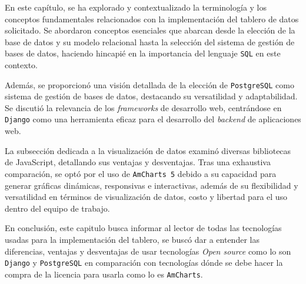 


En este capítulo, se ha explorado y contextualizado la terminología y los conceptos fundamentales relacionados con la implementación del tablero de datos solicitado. Se abordaron conceptos esenciales que abarcan desde la elección de la base de datos y su modelo relacional hasta la selección del sistema de gestión de bases de datos, haciendo hincapié en la importancia del lenguaje \texttt{SQL} en este contexto.

Además, se proporcionó una visión detallada de la elección de \texttt{PostgreSQL} como sistema de gestión de bases de datos, destacando su versatilidad y adaptabilidad. 
Se discutió la relevancia de los \textit{frameworks} de desarrollo web, centrándose en \texttt{Django} como una herramienta eficaz para el desarrollo del \textit{backend} de aplicaciones web.

La subsección dedicada a la visualización de datos examinó diversas bibliotecas de JavaScript, detallando sus ventajas y desventajas. Tras una exhaustiva comparación, se optó por el uso de \texttt{AmCharts 5} debido a su capacidad para generar gráficas dinámicas, responsivas e interactivas, además de su flexibilidad y versatilidad en términos de visualización de datos, costo y libertad para el uso dentro del equipo de trabajo.

En conclusión, este capitulo busca informar al lector de todas las tecnologías usadas para la implementación del tablero, se buscó dar a entender las diferencias, ventajas y desventajas de usar tecnologías \textit{Open source} como lo son \texttt{Django} y \texttt{PostgreSQL} en comparación con tecnologías dónde se debe hacer la compra de la licencia para usarla como lo es \texttt{AmCharts}.